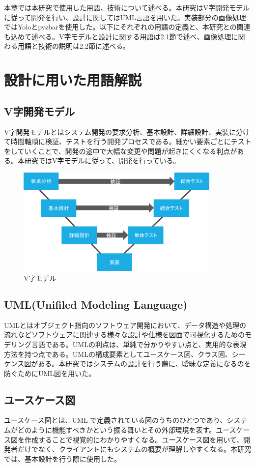 本章では本研究で使用した用語、技術について述べる。本研究はV字開発モデルに従って開発を行い、設計に関してはUML言語を用いた。実装部分の画像処理ではYoloとpyzbarを使用した。以下にそれぞれの用語の定義と、本研究との関連も込めて述べる。V字モデルと設計に関する用語は2.1節で述べ、画像処理に関わる用語と技術の説明は2.2節に述べる。

\section{設計に用いた用語解説}

\subsection*{V字開発モデル}
V字開発モデルとはシステム開発の要求分析、基本設計、詳細設計、実装に分けて時間軸順に検証、テストを行う開発プロセスである。細かい要素ごとにテストをしていくことで、開発の途中で大幅な変更や問題が起きにくくなる利点がある。本研究ではV字モデルに従って、開発を行っている。

\begin{figure}[htbp]
\centering
\includegraphics[width=10cm]{./pic/vjimodel.eps}
\caption{V字モデル}
\label{v_model}
\end{figure}

\subsection*{UML(Unifiled Modeling Language)}
UMLとはオブジェクト指向のソフトウェア開発において、データ構造や処理の流れなどソフトウェアに関連する様々な設計や仕様を図面で可視化するためのモデリング言語である。UMLの利点は、単純で分かりやすい点と、実用的な表現方法を持つ点である。UMLの構成要素としてユースケース図、クラス図、シーケンス図がある\cite{uml}。本研究ではシステムの設計を行う際に、曖昧な定義になるのを防ぐためにUML図を用いた。

\subsection*{ユースケース図}
ユースケース図とは、UML で定義されている図のうちのひとつであり、システムがどのように機能すべきかという振る舞いとその外部環境を表す。ユースケース図を作成することで視覚的にわかりやすくなる。ユースケース図を用いて、開発者だけでなく、クライアントにもシステムの概要が理解しやすくなる。本研究では、基本設計を行う際に使用した。


